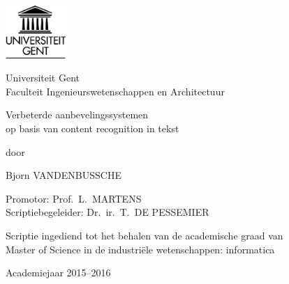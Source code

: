 

\begin{titlepage}

\setlength{\hoffset}{-1in}
\setlength{\voffset}{-1in}
\setlength{\topmargin}{1.5cm}
\setlength{\headheight}{0.5cm}
\setlength{\headsep}{1cm}
\setlength{\oddsidemargin}{3cm}
\setlength{\evensidemargin}{3cm}
\setlength{\footskip}{1.5cm}
\enlargethispage{1cm}

\fontsize{12pt}{14pt}
\selectfont

\begin{center}

\includegraphics[height=2cm]{fig/ruglogo}

\vspace{0.5cm}

Universiteit Gent\\
Faculteit Ingenieurswetenschappen en Architectuur\\

\vspace{4.5cm}

\fontsize{17.28pt}{21pt}
\selectfont

Verbeterde aanbevelingssystemen 
\\op basis van content recognition in tekst


\fontsize{12pt}{14pt}
\selectfont

\vspace{.6cm}

door 

\vspace{.4cm}

Bjorn VANDENBUSSCHE

\vspace{3.5cm}

Promotor: Prof.~L.~MARTENS\\
Scriptiebegeleider: Dr.~ir.~T.~DE PESSEMIER\\

\vspace{2cm}

Scriptie ingediend tot het behalen van de academische graad van\\ 
Master of Science in de industri\"ele wetenschappen: informatica

\vspace{1cm}

Academiejaar 2015--2016

\end{center}
\end{titlepage}
